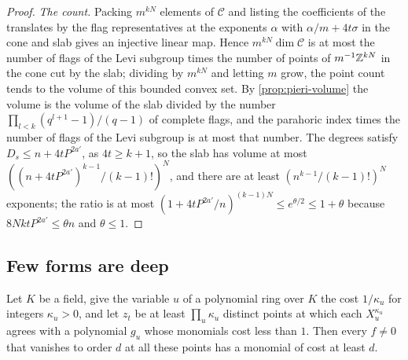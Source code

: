 \begin{proof}
\emph{The count.} Packing $m^{kN}$ elements of $\mathcal C$ and listing the coefficients of the translates by the flag representatives at the exponents $\alpha$ with $\alpha/m+4t\sigma$ in the cone and slab gives an injective linear map. Hence $m^{kN}\dim\mathcal C$ is at most the number of flags of the Levi subgroup times the number of points of $m^{-1}\mathbb{Z}^{kN}$ in the cone cut by the slab; dividing by
$m^{kN}$ and letting $m$ grow, the point count tends to the volume of this bounded convex set. By \cref{prop:pieri-volume} the volume is the volume of the slab divided by the number $\prod_{l<k}(q^{l+1}-1)/(q-1)$ of complete flags, and the parahoric index times the number of flags of the Levi subgroup is at most that number. The degrees satisfy $D_s\le n+4tP^{2a'}$, as $4t\ge k+1$, so the slab has volume at most $((n+4tP^{2a'})^{k-1}/(k-1)!)^N$, and there are at least
$(n^{k-1}/(k-1)!)^N$ exponents; the ratio is at most $(1+4tP^{2a'}/n)^{(k-1)N}\le e^{\theta/2}\le1+\theta$ because $8NktP^{2a'}\le\theta n$ and $\theta\le1$.
\end{proof}

\subsection{Few forms are deep}\label{ss:depth}

\begin{lemma}\label{lem:zeros-cost}
Let $K$ be a field, give the variable $u$ of a polynomial ring over $K$ the cost $1/\kappa_u$ for integers $\kappa_u>0$, and let $z_t$ be at least $\prod_u\kappa_u$ distinct points at which each $X_u^{\kappa_u}$ agrees with a polynomial $g_u$ whose monomials cost less than $1$. Then every $f\ne0$ that vanishes to order $d$ at all these points has a monomial of cost at least $d$.
\end{lemma}

